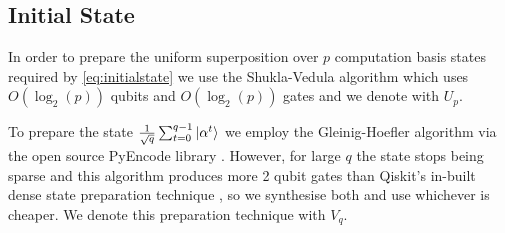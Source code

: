 \documentclass[aps,floatfix,10pt,amssymb,amsfont,amsmath,superscriptaddress,float,nofootinbib,longbibliography,nobalancelastpage,twocolumn]{revtex4-2}
\begin{document}
\subsection{Initial State}
In order to prepare the uniform superposition over $p$ computation basis states required by \eqref{eq:initialstate} we use the Shukla-Vedula algorithm \cite{shukla2024efficient} which uses $O(\log_2(p))$ qubits and $O(\log_2 (p))$ gates and we denote with $U_p$.

To prepare the state  $\frac{1}{\sqrt{q}}\sum_{t=0}^{q-1}\ket{\alpha^t}$ we employ the Gleinig-Hoefler algorithm \cite{10.1109/DAC18074.2021.9586240} via the open source PyEncode library \cite{suresh2026pyencode}. However, for large $q$ the state stops being sparse and this algorithm produces more 2 qubit gates than Qiskit's in-built dense state preparation technique \cite{iten2016quantum}, so we synthesise both and use whichever is cheaper. We denote this preparation technique with $V_q$.
\end{document}
